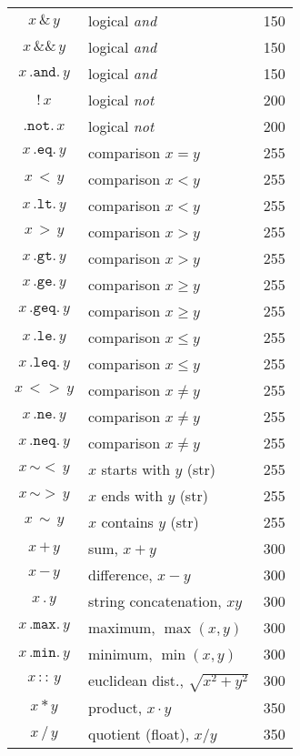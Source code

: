 \documentclass[11pt,a4paper]{refrep}
\begin{document}
\begin{description}
\begin{center}
\begin{longtable}{|c|p{12em}|r|}
   $x\,\mathtt{\&}\,y$ & logical \emph{and} & 150\\
   $x\,\mathtt{\&\&}\,y$ & logical \emph{and} & 150\\
   $x\,\mathtt{.and.}\,y$ & logical \emph{and} & 150\\
   $\mathtt{!}\,x$ & logical \emph{not} & 200\\
   $\mathtt{.not.}\,x$ & logical \emph{not} & 200\\
   $x\,\mathtt{.eq.}\,y$ & comparison $x=y$ & 255\\
   $x\,\mathtt{<}\,y$ & comparison $x<y$ & 255\\
   $x\,\mathtt{.lt.}\,y$ & comparison $x<y$ & 255\\
   $x\,\mathtt{>}\,y$ & comparison $x>y$ & 255\\
   $x\,\mathtt{.gt.}\,y$ & comparison $x>y$ & 255\\
   $x\,\mathtt{.ge.}\,y$ & comparison $x\geq y$ & 255\\
   $x\,\mathtt{.geq.}\,y$ & comparison $x\geq y$ & 255\\
   $x\,\mathtt{.le.}\,y$ & comparison $x\leq y$ & 255\\
   $x\,\mathtt{.leq.}\,y$ & comparison $x\leq y$ & 255\\
   $x\,\mathtt{<>}\,y$ & comparison $x\neq y$ & 255\\
   $x\,\mathtt{.ne.}\,y$ & comparison $x\neq y$ & 255\\
   $x\,\mathtt{.neq.}\,y$ & comparison $x\neq y$ & 255\\
   $x\,\mathtt{\sim<}\,y$ & $x$ starts with $y$ (str) & 255\\
   $x\,\mathtt{\sim>}\,y$ & $x$ ends with $y$ (str) & 255\\
   $x\,\mathtt{\sim}\,y$ & $x$ contains $y$ (str) & 255\\
   $x\,\mathtt{+}\,y$ & sum, $x+y$ & 300\\
   $x\,\mathtt{-}\,y$ & difference, $x-y$ & 300\\
   $x\,\mathtt{.}\,y$ & string concatenation, $xy$ & 300\\
   $x\,\mathtt{.max.}\,y$ & maximum, $\max(x,y)$ & 300\\
   $x\,\mathtt{.min.}\,y$ & minimum, $\min(x,y)$ & 300\\
   $x\,\mathtt{::}\,y$ & euclidean dist., $\sqrt{x^2+y^2}$ & 300\\
   $x\,\mathtt{*}\,y$ & product, $x\cdot y$ & 350\\
   $x\,\mathtt{/}\,y$ & quotient (float), $x/y$ & 350\\

\end{longtable}
\end{center}
\end{description}
\end{document}
